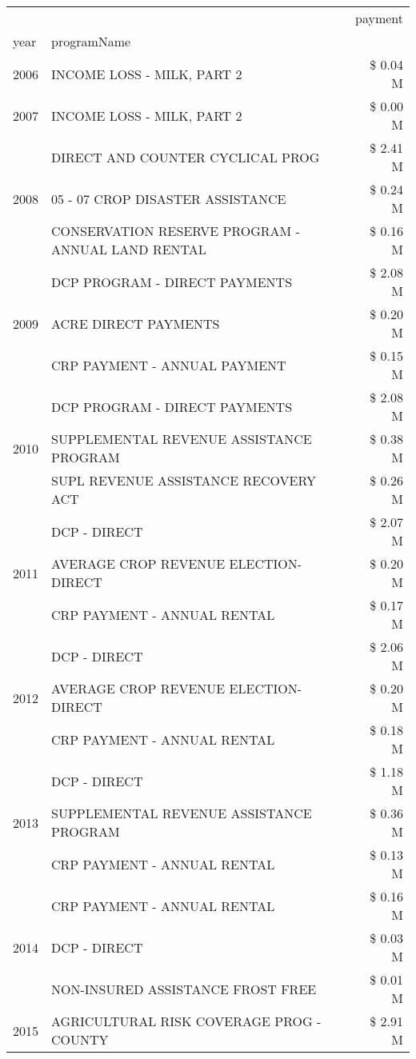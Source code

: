 \begin{tabular}{llr}
\toprule
 &  & payment \\
year & programName &  \\
\midrule
2006 & INCOME LOSS - MILK, PART 2 & \$ 0.04 M \\
\cline{1-3}
2007 & INCOME LOSS - MILK, PART 2 & \$ 0.00 M \\
\cline{1-3}
\multirow[t]{3}{*}{2008} & DIRECT AND COUNTER CYCLICAL PROG & \$ 2.41 M \\
 & 05 - 07 CROP DISASTER ASSISTANCE & \$ 0.24 M \\
 & CONSERVATION RESERVE PROGRAM - ANNUAL LAND RENTAL & \$ 0.16 M \\
\cline{1-3}
\multirow[t]{3}{*}{2009} & DCP PROGRAM - DIRECT PAYMENTS & \$ 2.08 M \\
 & ACRE DIRECT PAYMENTS & \$ 0.20 M \\
 & CRP PAYMENT - ANNUAL PAYMENT & \$ 0.15 M \\
\cline{1-3}
\multirow[t]{3}{*}{2010} & DCP PROGRAM - DIRECT PAYMENTS & \$ 2.08 M \\
 & SUPPLEMENTAL REVENUE ASSISTANCE PROGRAM & \$ 0.38 M \\
 & SUPL REVENUE ASSISTANCE RECOVERY ACT & \$ 0.26 M \\
\cline{1-3}
\multirow[t]{3}{*}{2011} & DCP - DIRECT & \$ 2.07 M \\
 & AVERAGE CROP REVENUE ELECTION-DIRECT & \$ 0.20 M \\
 & CRP PAYMENT - ANNUAL RENTAL & \$ 0.17 M \\
\cline{1-3}
\multirow[t]{3}{*}{2012} & DCP - DIRECT & \$ 2.06 M \\
 & AVERAGE CROP REVENUE ELECTION-DIRECT & \$ 0.20 M \\
 & CRP PAYMENT - ANNUAL RENTAL & \$ 0.18 M \\
\cline{1-3}
\multirow[t]{3}{*}{2013} & DCP - DIRECT & \$ 1.18 M \\
 & SUPPLEMENTAL REVENUE ASSISTANCE PROGRAM & \$ 0.36 M \\
 & CRP PAYMENT - ANNUAL RENTAL & \$ 0.13 M \\
\cline{1-3}
\multirow[t]{3}{*}{2014} & CRP PAYMENT - ANNUAL RENTAL & \$ 0.16 M \\
 & DCP - DIRECT & \$ 0.03 M \\
 & NON-INSURED ASSISTANCE FROST FREE & \$ 0.01 M \\
\cline{1-3}
\multirow[t]{3}{*}{2015} & AGRICULTURAL RISK COVERAGE PROG - COUNTY & \$ 2.91 M \\

\end{tabular}
